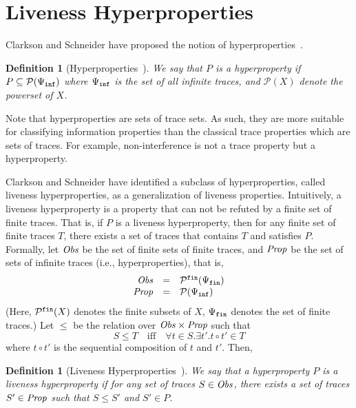 \documentclass[]{eptcs}
\newtheorem{definition}[theorem]{Definition}
\begin{document}
\section{Liveness Hyperproperties}

Clarkson and Schneider have proposed the notion of
hyperproperties~\cite{DBLP:journals/jcs/ClarksonS10}.  
\begin{definition}[Hyperproperties~\cite{DBLP:journals/jcs/ClarksonS10}]
  We say that $P$ is a hyperproperty if $P\subseteq
  \mathcal{P}(\Psi_{\tt inf})$ where $\Psi_{\tt{inf}}$ is the set of
  all infinite traces, and $\mathcal{P}(X)$ denote the powerset of
  $X$.
\end{definition}
Note that hyperproperties are sets of trace sets.  As such, they are
more suitable for classifying information properties than the
classical trace properties which are sets of traces.  For example,
non-interference is not a trace property but a hyperproperty.

Clarkson and Schneider have identified a subclass of hyperproperties,
called liveness hyperproperties, as a generalization of liveness
properties.  Intuitively, a liveness hyperproperty is a property that
can not be refuted by a finite set of finite traces.  That is, if $P$
is a liveness hyperproperty, then for any finite set of finite traces
$T$, there exists a set of traces that contains $T$ and satisfies $P$.
Formally, let ${\it Obs}$ be the set of finite sets of finite traces,
and ${\it Prop}$ be the set of sets of infinite traces (i.e.,
hyperproperties), that is,
\[
\begin{array}{rcl}
  {\it Obs}&=&\mathcal{P}^{\tt fin}(\Psi_{\tt{fin}})\\
  {\it Prop}&=&\mathcal{P}(\Psi_{\tt{inf}})
\end{array}
\]
(Here, $\mathcal{P}^{\tt{fin}}(X)$ denotes the finite subsets of $X$,
$\Psi_{\tt{fin}}$ denotes the set of finite traces.)  Let $\le$
be the relation over ${\it Obs}\times{\it Prop}$ such that
\[
S \le T\quad\textrm{iff}\quad\forall t\in S.\exists t'. t\circ t'\in T
\]
where $t\circ t'$ is the sequential composition of $t$ and $t'$.
Then,
\begin{definition}[Liveness
  Hyperproperties~\cite{DBLP:journals/jcs/ClarksonS10}]
  We say that a hyperproperty $P$ is a liveness hyperproperty if for
  any set of traces $S\in {\it Obs}$, there exists a set of traces
  $S'\in{\it Prop}$ such that $S\leq S'$ and $S'\in P$.
\end{definition}
\end{document}
